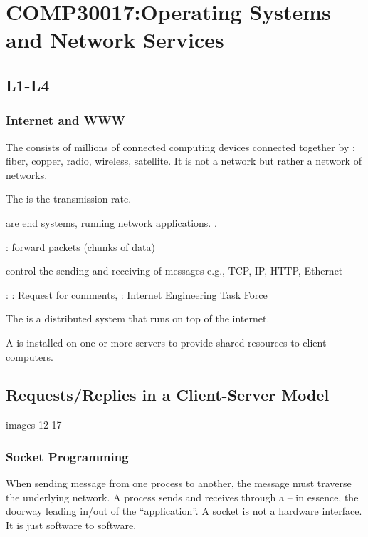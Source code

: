\section{COMP30017:Operating Systems and Network Services}
\subsection{L1-L4}
\subsubsection{Internet and WWW}
\begin{compactitem}
\item The  consists of millions of connected computing devices connected together by : fiber, copper, radio, wireless, satellite. It is not a network but rather a network of networks.
\item The  is the transmission rate.
\item {} are end systems, running network applications. .
\item {}: forward packets (chunks of data)
\item {} control the sending and receiving of messages
e.g., TCP, IP, HTTP, Ethernet
\item {}: 
: Request for comments,
: Internet Engineering Task Force
\item The  is a distributed system that runs on top of the internet.
\item A  is installed on one or more servers to provide shared resources to client computers.
\end{compactitem}


\subsection{Requests/Replies in a Client-Server Model}
images 12-17
\subsubsection{Socket Programming}
When sending message from one process to another, the message must
traverse the underlying network. A process sends and receives through a
 – in essence, the doorway leading in/out of the “application”. A socket is not a hardware interface. It is just software to software.

